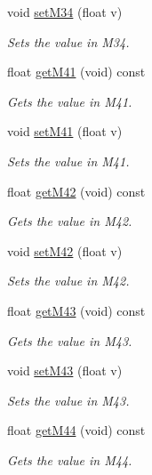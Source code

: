 \begin{DoxyCompactItemize}
void \hyperlink{class_matrix4_a267c3d29a567935c79bd190fe90b3380}{set\-M34} (float v)
\begin{DoxyCompactList}\small\item\em \-Sets the value in \-M34. \end{DoxyCompactList}\item 
float \hyperlink{class_matrix4_a1e6e2b72f9242bff6c50684d643ce1f0}{get\-M41} (void) const 
\begin{DoxyCompactList}\small\item\em \-Gets the value in \-M41. \end{DoxyCompactList}\item 
void \hyperlink{class_matrix4_a71a1d4aab6c775b73091a5ac3a722f02}{set\-M41} (float v)
\begin{DoxyCompactList}\small\item\em \-Sets the value in \-M41. \end{DoxyCompactList}\item 
float \hyperlink{class_matrix4_aacd7ecd6c3013239dd36cfccf1200910}{get\-M42} (void) const 
\begin{DoxyCompactList}\small\item\em \-Gets the value in \-M42. \end{DoxyCompactList}\item 
void \hyperlink{class_matrix4_a64917ed6e8b4fe22119e8036797428e1}{set\-M42} (float v)
\begin{DoxyCompactList}\small\item\em \-Sets the value in \-M42. \end{DoxyCompactList}\item 
float \hyperlink{class_matrix4_a7e6c5db168d39fe87612c4a8e300f9b0}{get\-M43} (void) const 
\begin{DoxyCompactList}\small\item\em \-Gets the value in \-M43. \end{DoxyCompactList}\item 
void \hyperlink{class_matrix4_ad0f71a2348e56e3bc7c6eb6c79da8012}{set\-M43} (float v)
\begin{DoxyCompactList}\small\item\em \-Sets the value in \-M43. \end{DoxyCompactList}\item 
float \hyperlink{class_matrix4_a708d8dbc954a99cef4582c494fa6c8e2}{get\-M44} (void) const 
\begin{DoxyCompactList}\small\item\em \-Gets the value in \-M44. \end{DoxyCompactList}\item 

\end{DoxyCompactItemize}
